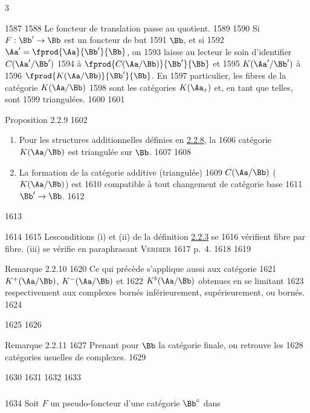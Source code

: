 3	\documentclass[10pt]{../fichiers-configuration-latex/smfart}
\begin{document}
  1587	
  1588	Le foncteur de translation passe au quotient.
  1589	
  1590	Si $F:\Bb'\rightarrow \Bb$ est un foncteur de but
  1591	$\Bb$, et si
  1592	$\Aa'=\fprod{\Aa}{\Bb'}{\Bb}$, on
  1593	laisse au lecteur le soin d'identifier $C(\Aa'/\Bb')$
  1594	à $\fprod{C(\Aa/\Bb)}{\Bb'}{\Bb}$ et
  1595	$K(\Aa'/\Bb')$ à
  1596	$\fprod{K(\Aa/\Bb)}{\Bb'}{\Bb}$. En
  1597	particulier, les fibres de la catégorie $K(\Aa/\Bb)$
  1598	sont les catégories $K(\Aa_x)$ et, en tant que telles, sont
  1599	triangulées.
  1600	
  1601	\begin{enonce*}{Proposition 2.2.9}
  1602	\begin{enumerate}
  1603	\renewcommand{\theenumi}{\roman{enumi}}
  1604	\renewcommand{\labelenumi}{(\theenumi)}
  1605	\item Pour les structures additionnelles définies en \hyperref[XVII.exem2.2.8]{2.2.8}, la
  1606	catégorie $K(\Aa/\Bb)$ est triangulée sur $\Bb$.
  1607	
  1608	\item La formation de la catégorie additive (\resp triangulée)
  1609	$C(\Aa/\Bb)$ (\resp $K(\Aa/\Bb)$) est
  1610	compatible à tout changement de catégorie base
  1611	$\Bb'\rightarrow \Bb$.
  1612	\end{enumerate}
  1613	\end{enonce*}
  1614	
  1615	Les\pageoriginale conditions (i) et (ii) de la définition \hyperref[XVII.def2.2.3]{2.2.3} se
  1616	vérifient fibre par fibre. (iii) se vérifie en paraphrasant \textsc{Verdier}
  1617	\cite{CD} p.~4.
  1618	
  1619	\begin{enonce*}[remark]{Remarque 2.2.10}
  1620	Ce qui précède s'applique aussi aux catégorie
  1621	$K^{+}(\Aa/\Bb)$, $K^{-}(\Aa/\Bb)$ et
  1622	$K^{b}(\Aa/\Bb)$ obtenues en se limitant
  1623	respectivement aux complexes bornés inférieurement, supérieurement, ou bornés.
  1624	\end{enonce*}
  1625	
  1626	\begin{enonce*}[remark]{Remarque 2.2.11}
  1627	Prenant pour $\Bb$ la catégorie finale, on retrouve les
  1628	catégories usuelles de complexes.
  1629	\end{enonce*}
  1630	
  1631	\setcounter{subsection}{2}
  1632	\setcounter{subsubsection}{11}
  1633	\subsubsection{}
  1634	Soit $F$ un pseudo-foncteur d'une catégorie $\Bb^{\circ}$ dans
\end{document}
